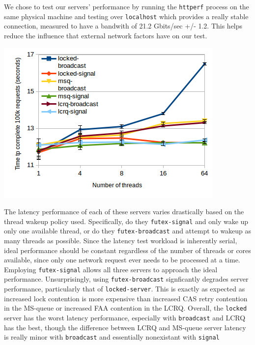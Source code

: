 \documentclass[twoside,10pt]{article}
\newenvironment{Figure}
  {\par\medskip\noindent\minipage{\linewidth}}
  {\endminipage\par\medskip}
\begin{document}
\begin{multicols}{2}
\begin{Figure}
We chose to test our servers' performance by running the \verb+httperf+
process on the same physical machine and testing over \verb+localhost+ which provides a really stable connection, measured to have a bandwith of 21.2 Gbits/sec +/- 1.2. This helps reduce the influence that external network factors have on our test. 

\includegraphics[width=\linewidth]{img/latencynthreads2.png}
\end{Figure}

The latency performance of each of these servers varies drastically
based on the thread wakeup policy used. Specifically, do they
\verb+futex-signal+ and only wake up only one available thread, or do
they \verb+futex-broadcast+ and attempt to wakeup as many threads as
possible. Since the latency test workload is inherently serial, ideal
performance should be constant regardless of the number of threads or
cores available, since only one network request ever needs to be
processed at a time. Employing \verb+futex-signal+ allows all three
servers to approach the ideal performance. Unsurprisingly, using
\verb+futex-broadcast+ signficantly degrades server performance,
particularly that of \verb+locked-server+. This is exactly as expected
as increased lock contention is more expensive than increased CAS
retry contention in the MS-queue or increased FAA contention in the
LCRQ. Overall, the \verb+locked+ server has the worst latency performance,
especially with \verb+broadcast+ and LCRQ has the best, though the difference
between LCRQ and MS-queue server latency is really minor with 
\verb+broadcast+ and essentially nonexistant with \verb+signal+


\end{multicols}
\end{document}
